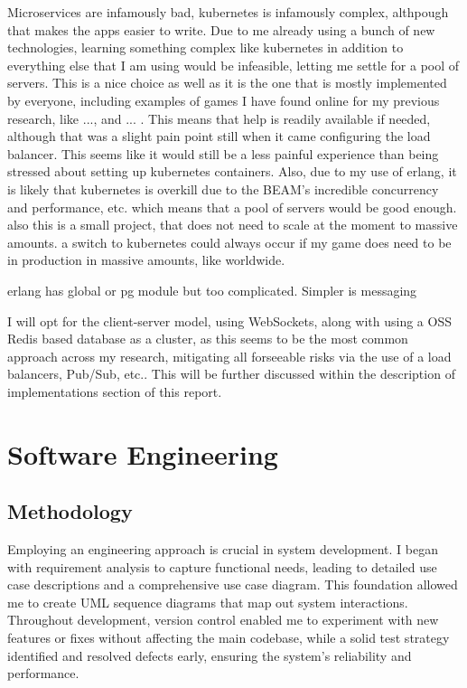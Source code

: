\documentclass[]{final}
\begin{document}
Microservices are infamously bad, kubernetes is infamously complex, althpough
that makes the apps easier to write. Due to me already using a bunch of new
technologies, learning something complex like kubernetes in addition to
everything else that I am using would be infeasible, letting me settle for
a pool of servers. This is a nice choice as well as it is the one that
is mostly implemented by everyone, including examples of games I have found
online for my previous research, like ..., and ... . This means that help
is readily available if needed, although that was a slight pain point still
when it came configuring the load balancer. This seems like it would still
be a less painful experience than being stressed about setting up kubernetes
containers. Also, due to my use of erlang, it is likely that kubernetes is
overkill due to the BEAM's incredible concurrency and performance, etc. which
means that a pool of servers would be good enough. also this is a small project,
that does not need to scale at the moment to massive amounts.
a switch to kubernetes could always occur if my game does need to be in
production in massive amounts, like worldwide.

erlang has global or pg module but too complicated. Simpler is messaging


I will opt for the client-server model, using WebSockets, along with using a OSS Redis based database as a cluster,
as this seems to be the most common approach
across my research, mitigating all forseeable risks via the use of a load balancers,
Pub/Sub, etc.. This will be further discussed within the description of implementations section of this report.

\chapter{Software Engineering}

\section{Methodology}
Employing an engineering approach is crucial in system development. I began with
requirement analysis to capture functional needs, leading to detailed use case
descriptions and a comprehensive use case diagram. This foundation allowed me to
create UML sequence diagrams that map out system interactions. Throughout development,
version control enabled me to experiment with new features or fixes without
affecting the main codebase, while a solid test strategy identified and resolved
defects early, ensuring the system's reliability and performance.
\end{document}
